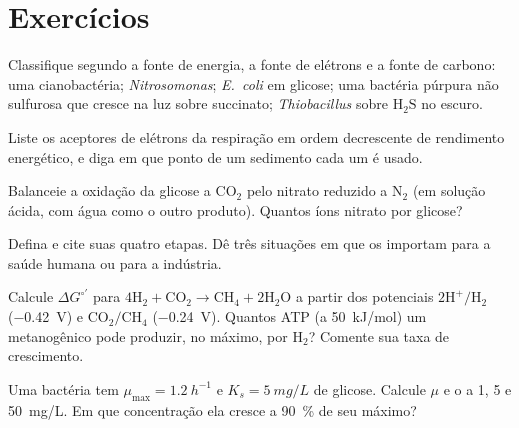\section{Exercícios}

\begin{exercise}[$\star$]\label{exo:b2:microbial-metabolism:1}
Classifique segundo a fonte de energia, a fonte de elétrons e a fonte
de carbono: uma cianobactéria; \emph{Nitrosomonas}; \emph{E.~coli} em
glicose; uma bactéria púrpura não sulfurosa que cresce na luz sobre
succinato; \emph{Thiobacillus} sobre $\mathrm{H_2S}$ no escuro.
\end{exercise}

\begin{exercise}[$\star$]\label{exo:b2:microbial-metabolism:2}
Liste os aceptores de elétrons da respiração em ordem decrescente de
rendimento energético, e diga em que ponto de um sedimento cada um é
usado.
\end{exercise}

\begin{exercise}[$\star$]\label{exo:b2:microbial-metabolism:3}
Balanceie a oxidação da glicose a $\mathrm{CO_2}$ pelo nitrato
reduzido a $\mathrm{N_2}$ (em solução ácida, com água como o outro
produto). Quantos íons nitrato por glicose?
\end{exercise}

\begin{exercise}[$\star$]\label{exo:b2:microbial-metabolism:4}
Defina  e cite suas quatro etapas. Dê três situações em que os
 importam para a saúde humana ou para a indústria.
\end{exercise}

\begin{exercise}[$\star\star$]\label{exo:b2:microbial-metabolism:5}
Calcule $\Delta G^{\circ\prime}$ para $4\mathrm{H_2} + \mathrm{CO_2}
\to \mathrm{CH_4} + 2\mathrm{H_2O}$ a partir dos potenciais
$\mathrm{2H^+/H_2}$ (\qty{-0.42}{V}) e $\mathrm{CO_2/CH_4}$
(\qty{-0.24}{V}). Quantos ATP (a \qty{50}{kJ/mol}) um metanogênico
pode produzir, no máximo, por $\mathrm{H_2}$? Comente sua taxa de
crescimento.
\end{exercise}

\begin{exercise}[$\star\star$]\label{exo:b2:microbial-metabolism:6}
Uma bactéria tem $\mu_{\max} = \qty{1.2}{h^{-1}}$ e $K_s =
\qty{5}{mg/L}$ de glicose. Calcule $\mu$ e o  a
1, 5 e \qty{50}{mg/L}. Em que concentração ela cresce a
\qty{90}{\%} de seu máximo?
\end{exercise}

